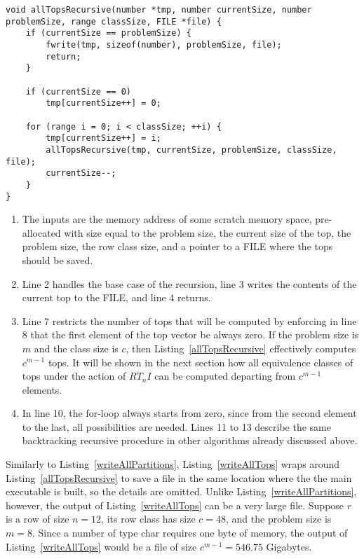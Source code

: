 \begin{lstlisting}[caption={Recursively computing all top vectors of a certain size.},label={allTopsRecursive}]
void allTopsRecursive(number *tmp, number currentSize, number problemSize, range classSize, FILE *file) {
    if (currentSize == problemSize) {
        fwrite(tmp, sizeof(number), problemSize, file);
        return;
    }

    if (currentSize == 0)
        tmp[currentSize++] = 0;

    for (range i = 0; i < classSize; ++i) {
        tmp[currentSize++] = i;
        allTopsRecursive(tmp, currentSize, problemSize, classSize, file);
        currentSize--;
    }
}
\end{lstlisting}

\begin{enumerate}
\item The inputs are the memory address of some scratch memory space, pre-allocated with size equal to the problem size, the current size of the top, the problem size, the row class size, and a pointer to a FILE where the tops should be saved.
\item Line 2 handles the base case of the recursion, line 3 writes the contents of the current top to the FILE, and line 4 returns.
\addtocounter{enumi}{4}
\item Line 7 restricts the number of tops that will be computed by enforcing in line 8 that the first element of the top vector be always zero. If the problem size is $m$ and the class size is $c$, then Listing~\ref{allTopsRecursive} effectively computes $c^{m - 1}$ tops. It will be shown in the next section how all equivalence classes of tops under the action of $RT_nI$ can be computed departing from $c^{m - 1}$ elements.
\addtocounter{enumi}{2}
\item In line 10, the for-loop always starts from zero, since from the second element to the last, all possibilities are needed. Lines 11 to 13 describe the same backtracking recursive procedure in other algorithms already discussed above.
\end{enumerate}

Similarly to Listing~\ref{writeAllPartitions}, Listing~\ref{writeAllTops} wraps around Listing~\ref{allTopsRecursive} to save a file in the same location where the the main executable is built, so the details are omitted. Unlike Listing~\ref{writeAllPartitions}, however, the output of Listing~\ref{writeAllTops} can be a very large file. Suppose $r$ is a row of size $n = 12$, its row class has size $c = 48$, and the problem size is $m = 8$. Since a number of type char requires one byte of memory, the output of Listing~\ref{writeAllTops} would be a file of size $c^{m - 1} = 546.75$ Gigabytes.

